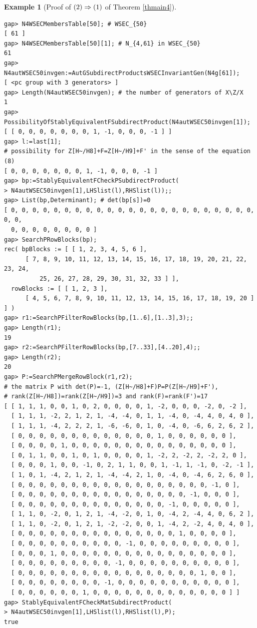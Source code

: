 \documentclass{amsart}
\theoremstyle{plain}
\theoremstyle{definition}
\newtheorem{example}[theorem]{Example}
\theoremstyle{remark}
\begin{document}
\begin{example}[Proof of ${\rm (2)}\Rightarrow {\rm (1)}$ of {Theorem \ref{thmain4}}]
\begin{verbatim}
gap> N4WSECMembersTable[50]; # WSEC_{50}
[ 61 ]
gap> N4WSECMembersTable[50][1]; # N_{4,61} in WSEC_{50}
61
gap> N4autWSEC50invgen:=AutGSubdirectProductsWSECInvariantGen(N4g[61]);
[ <pc group with 3 generators> ]
gap> Length(N4autWSEC50invgen); # the number of generators of X\Z/X
1
gap> PossibilityOfStablyEquivalentFSubdirectProduct(N4autWSEC50invgen[1]);
[ [ 0, 0, 0, 0, 0, 0, 0, 1, -1, 0, 0, 0, -1 ] ]
gap> l:=last[1]; 
# possibility for Z[H~/H8]+F=Z[H~/H9]+F' in the sense of the equation (8)
[ 0, 0, 0, 0, 0, 0, 0, 1, -1, 0, 0, 0, -1 ]
gap> bp:=StablyEquivalentFCheckPSubdirectProduct(
> N4autWSEC50invgen[1],LHSlist(l),RHSlist(l));;
gap> List(bp,Determinant); # det(bp[s])=0
[ 0, 0, 0, 0, 0, 0, 0, 0, 0, 0, 0, 0, 0, 0, 0, 0, 0, 0, 0, 0, 0, 0, 0, 0, 0, 
  0, 0, 0, 0, 0, 0, 0, 0 ]
gap> SearchPRowBlocks(bp);
rec( bpBlocks := [ [ 1, 2, 3, 4, 5, 6 ], 
      [ 7, 8, 9, 10, 11, 12, 13, 14, 15, 16, 17, 18, 19, 20, 21, 22, 23, 24, 
          25, 26, 27, 28, 29, 30, 31, 32, 33 ] ], 
  rowBlocks := [ [ 1, 2, 3 ], 
      [ 4, 5, 6, 7, 8, 9, 10, 11, 12, 13, 14, 15, 16, 17, 18, 19, 20 ] ] )
gap> r1:=SearchPFilterRowBlocks(bp,[1..6],[1..3],3);;
gap> Length(r1);
19
gap> r2:=SearchPFilterRowBlocks(bp,[7..33],[4..20],4);;
gap> Length(r2);
20
gap> P:=SearchPMergeRowBlock(r1,r2);
# the matrix P with det(P)=-1, (Z[H~/H8]+F)P=P(Z[H~/H9]+F'), 
# rank(Z[H~/H8])=rank(Z[H~/H9])=3 and rank(F)=rank(F')=17
[ [ 1, 1, 1, 0, 0, 1, 0, 2, 0, 0, 0, 0, 1, -2, 0, 0, 0, -2, 0, -2 ], 
  [ 1, 1, 1, -2, 2, 1, 2, 1, -4, -4, 0, 1, 1, -4, 0, -4, 4, 0, 4, 0 ], 
  [ 1, 1, 1, -4, 2, 2, 2, 1, -6, -6, 0, 1, 0, -4, 0, -6, 6, 2, 6, 2 ], 
  [ 0, 0, 0, 0, 0, 0, 0, 0, 0, 0, 0, 0, 0, 1, 0, 0, 0, 0, 0, 0 ], 
  [ 0, 0, 0, 0, 1, 0, 0, 0, 0, 0, 0, 0, 0, 0, 0, 0, 0, 0, 0, 0 ], 
  [ 0, 1, 1, 0, 0, 1, 0, 1, 0, 0, 0, 0, 1, -2, 2, -2, 2, -2, 2, 0 ], 
  [ 0, 0, 0, 1, 0, 0, -1, 0, 2, 1, 1, 0, 0, 1, -1, 1, -1, 0, -2, -1 ], 
  [ 1, 0, 1, -4, 2, 1, 2, 1, -4, -4, 2, 1, 0, -4, 0, -4, 6, 2, 6, 0 ], 
  [ 0, 0, 0, 0, 0, 0, 0, 0, 0, 0, 0, 0, 0, 0, 0, 0, 0, 0, -1, 0 ], 
  [ 0, 0, 0, 0, 0, 0, 0, 0, 0, 0, 0, 0, 0, 0, 0, 0, -1, 0, 0, 0 ], 
  [ 0, 0, 0, 0, 0, 0, 0, 0, 0, 0, 0, 0, 0, 0, -1, 0, 0, 0, 0, 0 ], 
  [ 1, 1, 0, -2, 0, 1, 2, 1, -4, -2, 0, 1, 0, -4, 2, -4, 4, 0, 6, 2 ], 
  [ 1, 1, 0, -2, 0, 1, 2, 1, -2, -2, 0, 0, 1, -4, 2, -2, 4, 0, 4, 0 ], 
  [ 0, 0, 0, 0, 0, 0, 0, 0, 0, 0, 0, 0, 0, 0, 0, 1, 0, 0, 0, 0 ], 
  [ 0, 0, 0, 0, 0, 0, 0, 0, 0, 0, -1, 0, 0, 0, 0, 0, 0, 0, 0, 0 ], 
  [ 0, 0, 0, 1, 0, 0, 0, 0, 0, 0, 0, 0, 0, 0, 0, 0, 0, 0, 0, 0 ], 
  [ 0, 0, 0, 0, 0, 0, 0, 0, 0, -1, 0, 0, 0, 0, 0, 0, 0, 0, 0, 0 ], 
  [ 0, 0, 0, 0, 0, 0, 0, 0, 0, 0, 0, 0, 0, 0, 0, 0, 0, 1, 0, 0 ], 
  [ 0, 0, 0, 0, 0, 0, 0, 0, -1, 0, 0, 0, 0, 0, 0, 0, 0, 0, 0, 0 ], 
  [ 0, 0, 0, 0, 0, 0, 1, 0, 0, 0, 0, 0, 0, 0, 0, 0, 0, 0, 0, 0 ] ]
gap> StablyEquivalentFCheckMatSubdirectProduct(
> N4autWSEC50invgen[1],LHSlist(l),RHSlist(l),P);
true


\end{verbatim}
\end{example}
\end{document}
